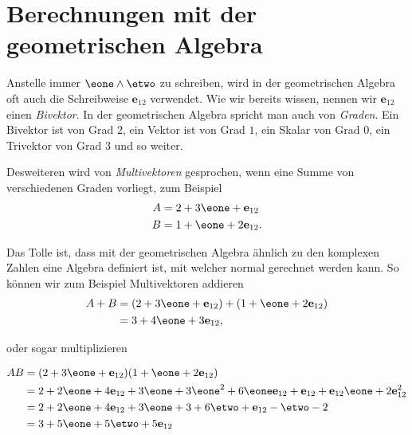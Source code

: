 \newcommand{\eot}{\mathbf{e}_{12}}
\section{Berechnungen mit der geometrischen Algebra}
Anstelle immer $\eone \wedge \etwo$ zu schreiben, wird in der geometrischen Algebra oft auch
die Schreibweise $\eot$ verwendet.
Wie wir bereits wissen, nennen wir $\eot$ einen \emph{Bivektor}. In der geometrischen Algebra
spricht man auch von \emph{Graden}. Ein Bivektor ist von Grad $2$, ein Vektor ist von Grad $1$, ein Skalar von
Grad $0$, ein Trivektor von Grad $3$ und so weiter.

Desweiteren wird von \emph{Multivektoren} gesprochen, wenn eine Summe von verschiedenen Graden vorliegt, zum Beispiel
\begin{align}
A &= 2 + 3 \eone + \eot \\
B &= 1 + \eone + 2 \eot.
\end{align}

Das Tolle ist, dass mit der geometrischen Algebra ähnlich zu den komplexen Zahlen eine Algebra definiert
ist, mit welcher normal gerechnet werden kann. So können wir zum Beispiel Multivektoren addieren
\begin{equation}
\begin{aligned}
A + B &= (2 + 3 \eone + \eot) + (1 + \eone + 2 \eot) \\
&= 3 + 4 \eone + 3 \eot,
\end{aligned}
\end{equation}

oder sogar multiplizieren

\begin{equation}
\begin{aligned}
A  B &= (2 + 3 \eone + \eot) (1 + \eone + 2 \eot) \\
&= 2 + 2 \eone + 4 \eot + 3 \eone + 3 \eone^2 + 6 \eone \eot + \eot + \eot \eone + 2 \eot^2 \\
&= 2 + 2 \eone + 4 \eot + 3 \eone + 3 + 6 \etwo + \eot - \etwo - 2 \\
&= 3 + 5 \eone + 5 \etwo + 5 \eot \\
\end{aligned}
\end{equation}
